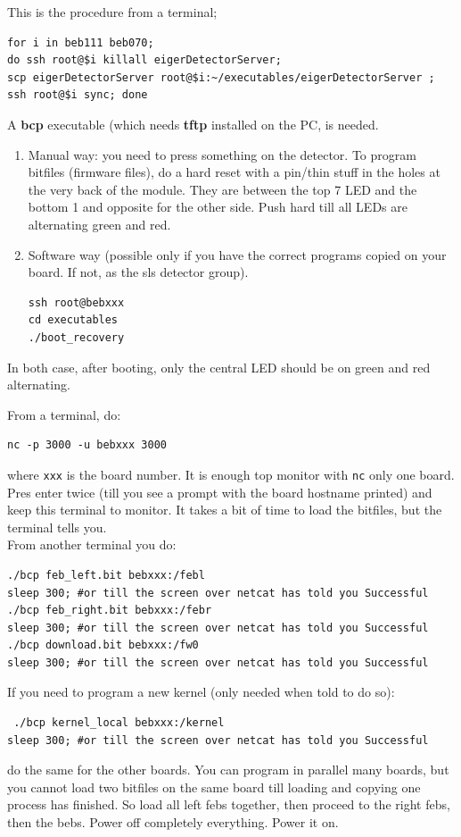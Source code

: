 \documentclass{article}
\begin{document}
{{{This is the procedure from a terminal;
\begin{verbatim}
for i in beb111 beb070; 
do ssh root@$i killall eigerDetectorServer; 
scp eigerDetectorServer root@$i:~/executables/eigerDetectorServer ; 
ssh root@$i sync; done
\end{verbatim}

A \textbf{bcp} executable (which needs \textbf{tftp} installed on the PC, is needed. 
\begin{enumerate}
\item Manual way: you need to press something on the detector. To program bitfiles (firmware files), do a hard reset with a pin/thin stuff in the holes at the very back of the module. They are between the top 7 LED and the bottom 1 and opposite for the other side. Push hard till all LEDs are alternating green and red.
\item Software way (possible only if you have the correct programs copied on your board. If not, as the sls detector group). 
\begin{verbatim}
ssh root@bebxxx
cd executables
./boot_recovery 
 \end{verbatim} 
\end{enumerate}
In both case, after booting, only the central LED should be on green and red alternating. 

From a terminal, do:
\begin{verbatim}
nc -p 3000 -u bebxxx 3000 
\end{verbatim} 
where {\tt{xxx}} is the board number. It is enough top monitor with {\tt{nc}} only one board. Pres enter twice (till you see a prompt with the board hostname printed) and keep this terminal to monitor. It takes a bit of time to load the bitfiles, but the terminal tells you.\\
From another terminal you do:
\begin{verbatim}
./bcp feb_left.bit bebxxx:/febl
sleep 300; #or till the screen over netcat has told you Successful
./bcp feb_right.bit bebxxx:/febr
sleep 300; #or till the screen over netcat has told you Successful
./bcp download.bit bebxxx:/fw0
sleep 300; #or till the screen over netcat has told you Successful
\end{verbatim}
If you need to program a new kernel (only needed when told to do so):
\begin{verbatim}
 ./bcp kernel_local bebxxx:/kernel
sleep 300; #or till the screen over netcat has told you Successful
\end{verbatim}
do the same for the other boards. You can program in parallel many boards, but you cannot load two bitfiles on the same board till loading and copying one process has finished. So load all left febs together, then proceed to the right febs, then the bebs. Power off completely everything. Power it on.

}}}
\end{document}
